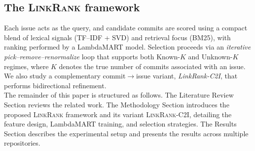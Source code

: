 \subsection{The \textsc{LinkRank} framework}

Each issue acts as the query, and candidate commits are scored using a compact blend of lexical signals (TF--IDF + SVD) and retrieval focus (BM25), with ranking performed by a LambdaMART model. Selection proceeds via an \emph{iterative pick--remove--renormalize} loop that supports both Known-$K$ and Unknown-$K$ regimes, where $K$ denotes the true number of commits associated with an issue. We also study a complementary commit$\rightarrow$issue variant, \textit{LinkRank-C2I}, that performs bidirectional refinement. \\

\noindent
The remainder of this paper is structured as follows. The Literature Review Section reviews the related work. The Methodology Section introduces the proposed \textsc{LinkRank} framework and its variant \textsc{LinkRank-C2I}, detailing the feature design, LambdaMART training, and selection strategies. The Results Section describes the experimental setup and presents the results across multiple repositories. 

% 
% 

